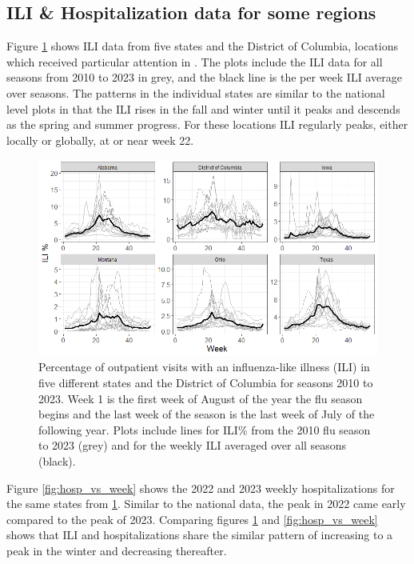 \documentclass[ba]{imsart}
\theoremstyle{plain}
\theoremstyle{definition}
\theoremstyle{remark}
\begin{document}
\begin{supplement}


\section{ILI \& Hospitalization data for some regions}

Figure \ref{fig:ili_vs_week} shows ILI data from five states and the District of Columbia, locations which received particular attention in \cite{osthus2021multiscale}. The plots include the ILI data for all seasons from 2010 to 2023 in grey, and the black line is the per week ILI average over seasons. The patterns in the individual states are similar to the national level plots in that the ILI rises in the fall and winter until it peaks and descends as the spring and summer progress. For these locations ILI regularly peaks, either locally or globally, at or near week 22. 

 \begin{figure}[hbt!]
    \centering
    \includegraphics[scale=.7]{Images/ili_vs_week.png}
    \caption{Percentage of outpatient visits with an influenza-like illness (ILI) in five different states and the District of Columbia for seasons 2010 to 2023. Week 1 is the first week of August of the year the flu season begins and the last week of the season is the last week of July of the following year.
     Plots include lines for ILI\% from the 2010 flu season to 2023 (grey) and for the weekly ILI averaged over all seasons (black).}
    \label{fig:ili_vs_week}
\end{figure}


Figure \ref{fig:hosp_vs_week} shows the 2022 and 2023 weekly hospitalizations for the same states from \ref{fig:ili_vs_week}. Similar to the national data, the peak in 2022 came early compared to the peak of 2023. Comparing figures \ref{fig:ili_vs_week} and \ref{fig:hosp_vs_week} shows that ILI and hospitalizations share the similar pattern of increasing to a peak in the winter and decreasing thereafter. 


\end{supplement}
\end{document}
